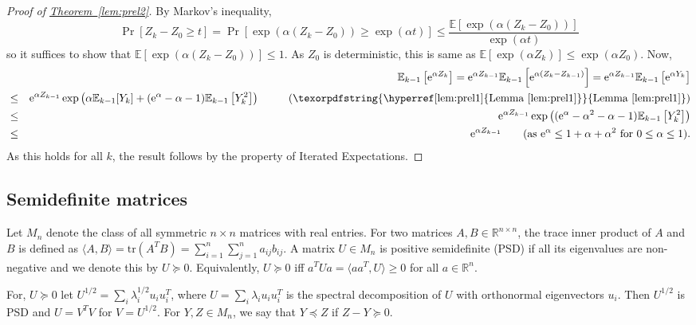 \documentclass[11pt]{article}
\newcommand{\E}{\mathbb{E}}
\theoremstyle{definition}
\newcommand{\expref}[2]{\texorpdfstring{\hyperref[#2]{#1~\ref{#2}}}{#1~\ref{#2}}}
\newcommand{\R}{{\mathbb R}}
\newcommand{\eee}{\mathrm e}
\begin{document}
\begin{proof}[Proof of \expref{Theorem}{lem:prel2}]  %
By Markov's inequality,
\[ \Pr[Z_k - Z_0 \geq t ]  = \Pr[\exp(\alpha (Z_k-Z_0)) \geq \exp(\alpha t)] \leq \frac{\E[\exp(\alpha (Z_k-Z_0))] }{\exp(\alpha t)}\]
so it suffices to show that $\E[ \exp(\alpha (Z_k-Z_0)) ]  \leq 1$. As $Z_0$ is deterministic,  this is same as $ \E[\exp(\alpha Z_k)] \leq  \exp(\alpha Z_0)$. Now,
%
%
%
%
%
\begin{eqnarray*}
&&\E_{k-1}\left[\eee^{\alpha Z_k}\right] =  \eee^{\alpha Z_{k-1}}\E_{k-1}\left[\eee^{\alpha(Z_k-Z_{k-1})}\right]  =  \eee^{\alpha Z_{k-1}}\E_{k-1}\left[\eee^{\alpha Y_k}\right] \\
& \le &  \eee^{\alpha Z_{k-1}} \exp\left( \alpha \E_{k-1}[Y_k] +(\eee^{ \alpha} -\alpha-1 )\E_{k-1}\left[Y_k^2\right]\right)  \,\,\,\,  \qquad \textrm{(\expref{Lemma}{lem:prel1})}\\
 & \le & \eee^{\alpha Z_{k-1}}\exp\left((\eee^{ \alpha} -\alpha^2 - \alpha-1 )\E_{k-1}\left[Y_k^2\right]\right) \\
 & \leq & \eee^{\alpha Z_{k-1}}   \qquad \textrm{(as $\eee^\alpha \leq 1 + \alpha + \alpha^2$ for $0 \leq \alpha \leq 1$)}.
\end{eqnarray*}
As this holds for all $k$, the result follows by the property of Iterated Expectations.
\end{proof}


%
%
%
%
%
%
%
%
%

\subsection{Semidefinite matrices}
\label{s:psd}
Let $M_n$ denote the class of all symmetric  $n\times n$ matrices with real entries.
For two matrices $A,B \in \mathbb{R}^{n \times n}$,
the trace inner product of $A$ and $B$ is defined as
$\langle A, B\rangle = \textrm{tr}(A^TB) = \sum_{i=1}^n \sum_{j=1}^n a_{ij}b_{ij}.$
A matrix $U \in M_n$ is positive semidefinite (PSD) if all its eigenvalues are non-negative and we denote this by $U \succeq 0$.
Equivalently, $U \succeq 0$ iff   $a^TUa = \langle aa^T, U \rangle \geq 0$ for all $a \in \R^n$.

For, $U \succeq 0$ let $U^{1/2} = \sum_i \lambda_i^{1/2} u_iu_i^T$, where $
U = \sum_i \lambda_i u_iu_i^T$ is the spectral decomposition of $U$ with orthonormal eigenvectors $u_i$. Then $U^{1/2}$ is PSD and $U = V^T V$ for $V= U^{1/2}$.
%
For $Y,Z \in M_n$, we say that $Y \preceq Z$ if $Z-Y  \succeq 0$.
\end{document}
